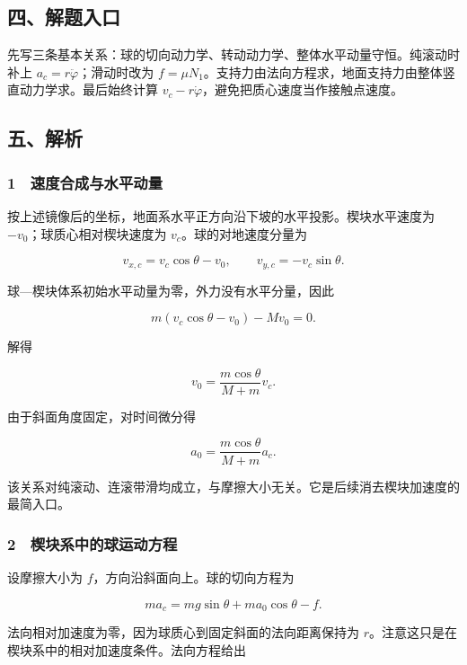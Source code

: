 \documentclass[12pt,a4paper,fontset=fandol]{ctexart}
\begin{document}
\subsection{四、解题入口}\label{ux56dbux89e3ux9898ux5165ux53e3-2}

先写三条基本关系：球的切向动力学、转动动力学、整体水平动量守恒。纯滚动时补上
\(a_c=r\ddot\varphi\)；滑动时改为
\(f=\mu N_1\)。支持力由法向方程求，地面支持力由整体竖直动力学求。最后始终计算
\(v_c-r\dot\varphi\)，避免把质心速度当作接触点速度。

\subsection{五、解析}\label{ux4e94ux89e3ux6790-2}

\subsubsection{1　速度合成与水平动量}\label{ux901fux5ea6ux5408ux6210ux4e0eux6c34ux5e73ux52a8ux91cf}

按上述镜像后的坐标，地面系水平正方向沿下坡的水平投影。楔块水平速度为
\(-v_0\)；球质心相对楔块速度为 \(v_c\)。球的对地速度分量为

\[v_{x,c}=v_c\cos\theta-v_0,\qquad
v_{y,c}=-v_c\sin\theta.\]

球---楔块体系初始水平动量为零，外力没有水平分量，因此

\[m(v_c\cos\theta-v_0)-Mv_0=0.\]

解得

\[\boxed{v_0=\frac{m\cos\theta}{M+m}v_c.}\]

由于斜面角度固定，对时间微分得

\[\boxed{a_0=\frac{m\cos\theta}{M+m}a_c.}\]

该关系对纯滚动、连滚带滑均成立，与摩擦大小无关。它是后续消去楔块加速度的最简入口。

\subsubsection{2　楔块系中的球运动方程}\label{ux6954ux5757ux7cfbux4e2dux7684ux7403ux8fd0ux52a8ux65b9ux7a0b}

设摩擦大小为 \(f\)，方向沿斜面向上。球的切向方程为

\[\boxed{ma_c=mg\sin\theta+ma_0\cos\theta-f.}\]

法向相对加速度为零，因为球质心到固定斜面的法向距离保持为
\(r\)。注意这只是在楔块系中的相对加速度条件。法向方程给出
\end{document}
